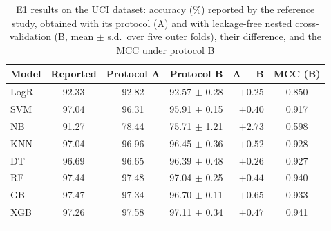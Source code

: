 \begin{table}[htbp]
\caption{E1 results on the UCI dataset: accuracy (\%) reported by the reference study, obtained with its protocol (A) and with leakage-free nested cross-validation (B, mean $\pm$ s.d.\ over five outer folds), their difference, and the MCC under protocol B}\label{tab:e1-uci}%
\begin{tabular}{@{}lcccrc@{}}
\toprule
Model & Reported & Protocol A & Protocol B & A $-$ B & MCC (B) \\
\midrule
LogR & 92.33 & 92.82 & 92.57 $\pm$ 0.28 & $+0.25$ & 0.850 \\
SVM & 97.04 & 96.31 & 95.91 $\pm$ 0.15 & $+0.40$ & 0.917 \\
NB & 91.27 & 78.44 & 75.71 $\pm$ 1.21 & $+2.73$ & 0.598 \\
KNN & 97.04 & 96.96 & 96.45 $\pm$ 0.36 & $+0.52$ & 0.928 \\
DT & 96.69 & 96.65 & 96.39 $\pm$ 0.48 & $+0.26$ & 0.927 \\
RF & 97.44 & 97.48 & 97.04 $\pm$ 0.25 & $+0.44$ & 0.940 \\
GB & 97.47 & 97.34 & 96.70 $\pm$ 0.11 & $+0.65$ & 0.933 \\
XGB & 97.26 & 97.58 & 97.11 $\pm$ 0.34 & $+0.47$ & 0.941 \\
\botrule
\end{tabular}
\end{table}
